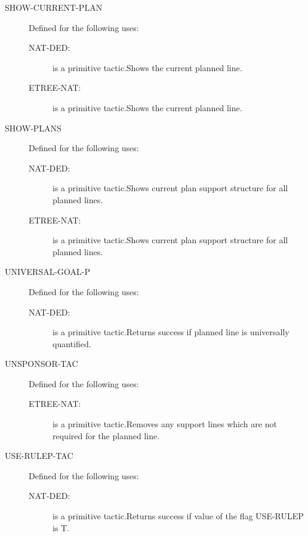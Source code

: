 \begin{description}
\item[SHOW-CURRENT-PLAN]  Defined for the following uses:
\begin{description}
\item[NAT-DED:]  is a primitive tactic.Shows the current planned line.

\item[ETREE-NAT:]  is a primitive tactic.Shows the current planned line.

\end{description}

\item[SHOW-PLANS]  Defined for the following uses:
\begin{description}
\item[NAT-DED:]  is a primitive tactic.Shows current plan support structure for all planned lines.

\item[ETREE-NAT:]  is a primitive tactic.Shows current plan support structure for all planned lines.

\end{description}

\item[UNIVERSAL-GOAL-P]  Defined for the following uses:
\begin{description}
\item[NAT-DED:]  is a primitive tactic.Returns success if planned line is universally quantified.

\end{description}

\item[UNSPONSOR-TAC]  Defined for the following uses:
\begin{description}
\item[ETREE-NAT:]  is a primitive tactic.Removes any support lines which are not required for the planned line.

\end{description}

\item[USE-RULEP-TAC]  Defined for the following uses:
\begin{description}
\item[NAT-DED:]  is a primitive tactic.Returns success if value of the flag USE-RULEP is T.


\end{description}
\end{description}
